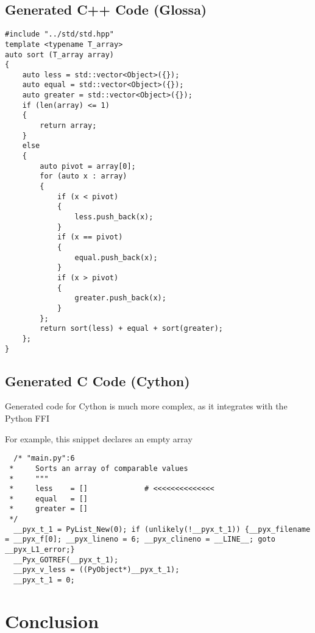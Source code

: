 \documentclass{article}
\begin{document}
\lstset{language=C}

\newpage
\subsection{Generated C++ Code (Glossa)}

\begin{lstlisting}
#include "../std/std.hpp"
template <typename T_array>
auto sort (T_array array)
{
    auto less = std::vector<Object>({});
    auto equal = std::vector<Object>({});
    auto greater = std::vector<Object>({});
    if (len(array) <= 1)
    {
        return array;
    }
    else
    {
        auto pivot = array[0];
        for (auto x : array)
        {
            if (x < pivot)
            {
                less.push_back(x);
            }
            if (x == pivot)
            {
                equal.push_back(x);
            }
            if (x > pivot)
            {
                greater.push_back(x);
            }
        };
        return sort(less) + equal + sort(greater);
    };
}
\end{lstlisting}

\newpage
\subsection{Generated C Code (Cython)}

Generated code for Cython is much more complex, as it integrates with the Python FFI

For example, this snippet declares an empty array

\begin{lstlisting}
  /* "main.py":6
 *     Sorts an array of comparable values
 *     """
 *     less    = []             # <<<<<<<<<<<<<<
 *     equal   = []
 *     greater = []
 */
  __pyx_t_1 = PyList_New(0); if (unlikely(!__pyx_t_1)) {__pyx_filename = __pyx_f[0]; __pyx_lineno = 6; __pyx_clineno = __LINE__; goto __pyx_L1_error;}
  __Pyx_GOTREF(__pyx_t_1);
  __pyx_v_less = ((PyObject*)__pyx_t_1);
  __pyx_t_1 = 0;
\end{lstlisting}

\newpage

\section{Conclusion}
\end{document}
